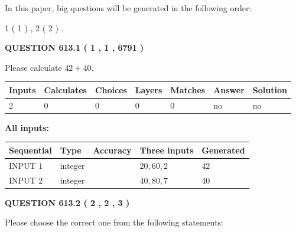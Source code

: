 \documentclass[12pt]{article}
\begin{document}
\vspace{0.2in}
   
In this paper, big questions will be generated in the following order: 
   
   
   1 ( 1 )
 ,
   2 ( 2 )
 .
  
\vspace{0.2in}
  
{\textbf{\Large{QUESTION
613.1 
 ( 1 , 1 , 6791 )
}}}
  
  
 
Please calculate $ %
42 +  %
40 $.
 
 
   
   
   
   
\noindent\begin{tabular}{|l|l|l|l|l|l|l|}
 \hline
Inputs & Calculates & Choices & Layers & Matches & Answer & Solution \\ \hline
 2  & 
 0  & 
 0
  & 
 0  & 
 0  & 
  no & 
  no 
  \\ \hline
 \end{tabular}
   
   
   
   
\noindent{}
   
   
   
   
\noindent\vspace{0.1in}\hspace{-0.08in} {\textbf{\Large{All inputs: }}}
   
   
  
  
\noindent\begin{tabular}{|l|l|l|l|l|}
\hline
 Sequential & Type & Accuracy & Three inputs & Generated \\ 
\hline
 
 
  INPUT $  1 $ & integer &  & $
 20
 , 
 60
 , 
 2
 $ & $ 42 $ 
 \\  \hline  
 
 
  INPUT $  2 $ & integer &  & $
 40
 , 
 80
 , 
 7
 $ & $ 40 $ 
 \\  \hline  
 \end{tabular}
   
   
  
\vspace{0.2in}
  
{\textbf{\Large{QUESTION
613.2 
 ( 2 , 2 , 3 )
}}}
  
  
Please choose the correct one from the following statements:
 
\end{document}
